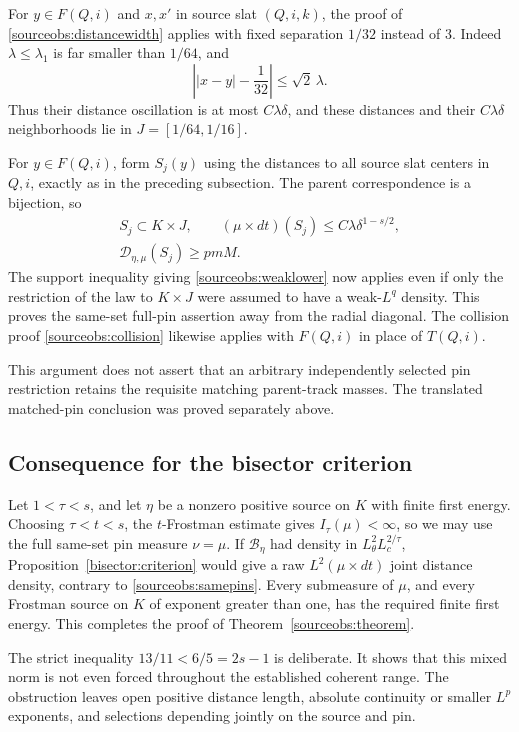 For \(y\in F(Q,i)\) and \(x,x'\) in source slat \((Q,i,k)\),
the proof of \eqref{sourceobs:distancewidth} applies with
fixed separation \(1/32\) instead of \(3\). Indeed
\(\lambda\le\lambda_1\) is far smaller than \(1/64\), and
\[
 \left||x-y|-\frac1{32}\right|\le\sqrt2\,\lambda.
\]
Thus their distance oscillation is at most \(C\lambda\delta\),
and these distances and their \(C\lambda\delta\) neighborhoods
lie in \(J=[1/64,1/16]\).

For \(y\in F(Q,i)\), form \(S_j(y)\) using the distances to
all source slat centers in \(Q,i\), exactly as in the preceding
subsection. The parent correspondence is a bijection, so
\begin{equation}\label{sourceobs:samepins}
 \begin{gathered}
 S_j\subset K\times J,\qquad
 (\mu\times dt)(S_j)\le C\lambda\delta^{1-s/2},\\
 \mathcal D_{\eta,\mu}(S_j)\ge pmM.
 \end{gathered}
\end{equation}
The support inequality giving \eqref{sourceobs:weaklower} now
applies even if only the restriction of the law to \(K\times J\)
were assumed to have a weak-\(L^q\) density. This proves the
same-set full-pin assertion away from the radial diagonal.
The collision proof \eqref{sourceobs:collision} likewise applies
with \(F(Q,i)\) in place of \(T(Q,i)\).

This argument does not assert that an arbitrary independently
selected pin restriction retains the requisite matching
parent-track masses. The translated matched-pin conclusion was
proved separately above.

\subsection{Consequence for the bisector criterion}

Let \(1<\tau<s\), and let \(\eta\) be a nonzero positive source
on \(K\) with finite first energy. Choosing \(\tau<t<s\), the
\(t\)-Frostman estimate gives \(I_\tau(\mu)<\infty\), so we may
use the full same-set pin measure \(\nu=\mu\).
If \(\mathcal B_\eta\) had density in
\(L^2_\theta L^{2/\tau}_c\), Proposition~\ref{bisector:criterion}
would give a raw \(L^2(\mu\times dt)\) joint distance density,
contrary to \eqref{sourceobs:samepins}. Every submeasure of \(\mu\),
and every Frostman source on \(K\) of exponent greater than one,
has the required finite first energy. This completes the proof of
Theorem~\ref{sourceobs:theorem}.

The strict inequality \(13/11<6/5=2s-1\) is deliberate. It shows
that this mixed norm is not even forced throughout the established
coherent range. The obstruction leaves open positive distance length,
absolute continuity or smaller \(L^p\) exponents, and selections
depending jointly on the source and pin.
